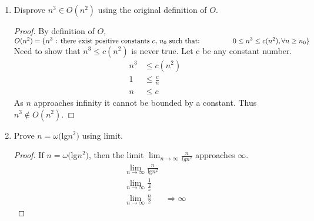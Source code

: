 \documentclass{article}
\begin{document}
\begin{enumerate}
\begin{proof}
\begin{align*}
                        -2 &\leq 1
                    \end{align*}
                    This shows that $n^2-3n-20\in\Theta(n^2)$ is true with $c_1 = \frac{1}{2}$, $c_2 = 1$ for all $n \geq 10$
                \end{proof}
            \item Disprove $n^3\in O(n^2)$ using the original definition of $O$.
            \begin{proof}
                By definition of $O$,\\$O(n^2) = \{n^3 \text{ : there exist positive constants } c \text{, } n_0 \text{ such that: }\\ 
                \text{\hspace{1.5cm}}0\leq n^3\leq c(n^2), \forall n\geq n_0\}$\\
                Need to show that $n^3\leq c(n^2)$ is never true. Let c be any constant number.
                \begin{align*}
                    n^3 &\leq c(n^2)\\
                    1 &\leq \frac{c}{n} \\
                    n &\leq c
                \end{align*}
                As $n$ approaches infinity it cannot be bounded by a constant. Thus $n^3\not\in O(n^2)$.
            \end{proof}
            \item Prove $n=\omega($lg$n^2)$ using limit.
            \begin{proof}
                If $n=\omega($lg$n^2)$, then the limit $\lim_{n\to\infty}\frac{n}{lgn^2}$ approaches $\infty$.\\
                \begin{align*}
                    \lim_{n\to\infty}\frac{n}{\text{lg}n^2}&\\
                    \lim_{n\to\infty}\frac{1}{\frac{2}{n}}&\\
                    \lim_{n\to\infty}\frac{n}{2}& \Rightarrow \infty
                \end{align*}
            \end{proof}
        \end{enumerate}
    
\end{document}
